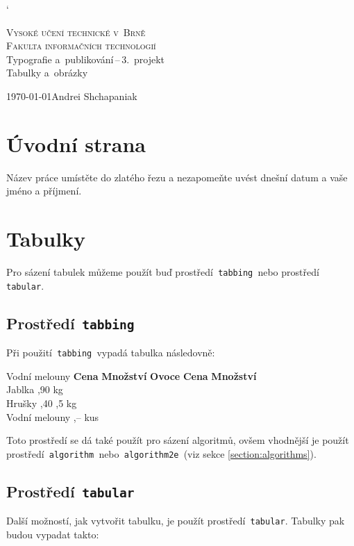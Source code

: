 \documentclass[a4paper, 11pt]{article}
\begin{document}
	\catcode`

	\begin{titlepage}
        \begin{center}
            \Huge\textsc{Vysoké učení technické v~Brně} \\
			\huge\textsc{Fakulta informačních technologií} \\
            \LARGE{Typografie a~publikování\,--\,3.~projekt} \\
			\Huge{Tabulky a~obrázky}
        \end{center}
        {\Large \today \hfill Andrei Shchapaniak}
    \end{titlepage}

	\section{Úvodní strana}
	Název práce umístěte do zlatého řezu a nezapomeňte uvést dnešní datum a vaše jméno a příjmení.

	\section{Tabulky}
	Pro sázení tabulek můžeme použít buď prostředí\texttt{ tabbing }nebo prostředí\texttt{ tabular}.

	\subsection{Prostředí\texttt{ tabbing}}
	Při použití\texttt{ tabbing }vypadá tabulka následovně:

	\begin{tabbing}
		Vodní melouny \quad	\= \textbf{Cena} \quad	\= \textbf{Množství}	\kill
		\textbf{Ovoce}		\> \textbf{Cena}		\> \textbf{Množství}	\\
		Jablka				,90				 kg					\\
		Hrušky				,40				,5 kg				\\
		Vodní melouny		,--				 kus				\\
	\end{tabbing}
	Toto prostředí se dá také použít pro sázení algoritmů, ovšem vhodnější je použít
	prostředí\texttt{ algorithm }nebo\texttt{ algorithm2e }(viz sekce \ref{section:algorithms}).

	\subsection{Prostředí\texttt{ tabular}}
	Další možností, jak vytvořit tabulku, je použít prostředí\texttt{ tabular}. Tabulky pak
	budou vypadat takto\footnotemark:
\end{document}
